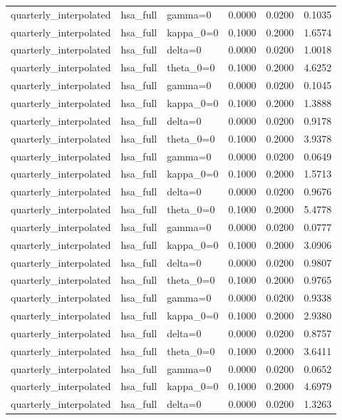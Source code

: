 \begin{tabular}{lllrrr}
quarterly\_interpolated & hsa\_full & gamma=0 & 0.0000 & 0.0200 & 0.1035 \\
quarterly\_interpolated & hsa\_full & kappa\_0=0 & 0.1000 & 0.2000 & 1.6574 \\
quarterly\_interpolated & hsa\_full & delta=0 & 0.0000 & 0.0200 & 1.0018 \\
quarterly\_interpolated & hsa\_full & theta\_0=0 & 0.1000 & 0.2000 & 4.6252 \\
quarterly\_interpolated & hsa\_full & gamma=0 & 0.0000 & 0.0200 & 0.1045 \\
quarterly\_interpolated & hsa\_full & kappa\_0=0 & 0.1000 & 0.2000 & 1.3888 \\
quarterly\_interpolated & hsa\_full & delta=0 & 0.0000 & 0.0200 & 0.9178 \\
quarterly\_interpolated & hsa\_full & theta\_0=0 & 0.1000 & 0.2000 & 3.9378 \\
quarterly\_interpolated & hsa\_full & gamma=0 & 0.0000 & 0.0200 & 0.0649 \\
quarterly\_interpolated & hsa\_full & kappa\_0=0 & 0.1000 & 0.2000 & 1.5713 \\
quarterly\_interpolated & hsa\_full & delta=0 & 0.0000 & 0.0200 & 0.9676 \\
quarterly\_interpolated & hsa\_full & theta\_0=0 & 0.1000 & 0.2000 & 5.4778 \\
quarterly\_interpolated & hsa\_full & gamma=0 & 0.0000 & 0.0200 & 0.0777 \\
quarterly\_interpolated & hsa\_full & kappa\_0=0 & 0.1000 & 0.2000 & 3.0906 \\
quarterly\_interpolated & hsa\_full & delta=0 & 0.0000 & 0.0200 & 0.9807 \\
quarterly\_interpolated & hsa\_full & theta\_0=0 & 0.1000 & 0.2000 & 0.9765 \\
quarterly\_interpolated & hsa\_full & gamma=0 & 0.0000 & 0.0200 & 0.9338 \\
quarterly\_interpolated & hsa\_full & kappa\_0=0 & 0.1000 & 0.2000 & 2.9380 \\
quarterly\_interpolated & hsa\_full & delta=0 & 0.0000 & 0.0200 & 0.8757 \\
quarterly\_interpolated & hsa\_full & theta\_0=0 & 0.1000 & 0.2000 & 3.6411 \\
quarterly\_interpolated & hsa\_full & gamma=0 & 0.0000 & 0.0200 & 0.0652 \\
quarterly\_interpolated & hsa\_full & kappa\_0=0 & 0.1000 & 0.2000 & 4.6979 \\
quarterly\_interpolated & hsa\_full & delta=0 & 0.0000 & 0.0200 & 1.3263 \\

\end{tabular}

